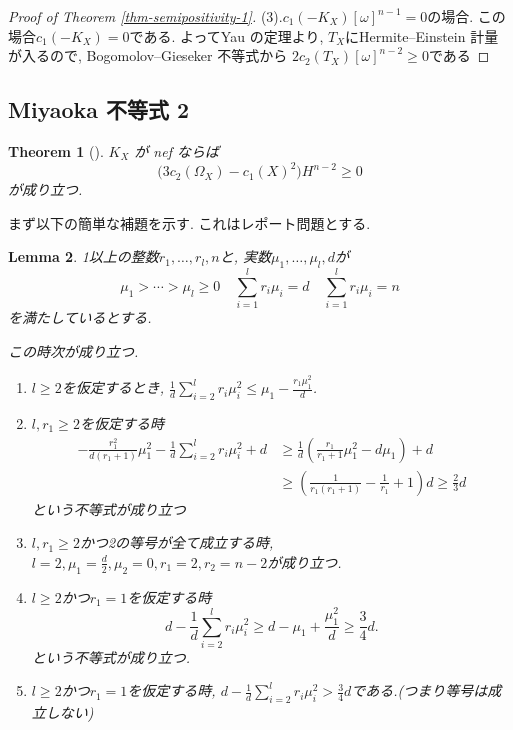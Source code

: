 \documentclass[dvipdfmx,a4paper,11pt]{article} %
\newtheorem{thm}{Theorem}[section]
\newtheorem{lem}[thm]{Lemma}
\theoremstyle{definition}
\theoremstyle{remark}
\numberwithin{equation}{section}
\begin{document}
\begin{proof}[Proof of Theorem \ref{thm-semipositivity-1}]
(3).$c_1(-K_X)[\omega]^{n-1}=0$の場合.
この場合$c_1(-K_X)=0$である. よってYau の定理より, $T_X$にHermite--Einstein 計量が入るので, Bogomolov--Gieseker 不等式から
$2c_2(T_X)[\omega]^{n-2} \ge 0$である
\end{proof}


\subsection{Miyaoka 不等式 2}

\begin{thm}[{\cite[Chapter 7]{Miy87}}]
\label{thm-semipositivity-2}
\(K_X\) が nef ならば
\[
\bigl(3c_2(\Omega_X)-c_1(X)^2\bigr)H^{n-2} \geq 0
\]
が成り立つ.
\end{thm}


まず以下の簡単な補題を示す. これはレポート問題とする.
\begin{lem}
\label{lem-miyaoka-2}
1以上の整数$r_1, \ldots, r_l, n$と, 実数$\mu_1, \ldots, \mu_l, d$が
\[
\mu_1 > \cdots > \mu_l \geq 0
\quad
\sum_{i=1}^{l}r_i\mu_i=d
\quad 
\sum_{i=1}^{l}r_i\mu_i=n
\]
を満たしているとする. 

この時次が成り立つ.
\begin{enumerate}
\item  $l\ge 2$を仮定するとき, $\frac{1}{d} \sum_{i=2}^{l}r_i \mu_i^2 \le \mu_1 - \frac{r_1 \mu_1^{2}}{d}$. 
\item $l, r_1\ge 2$を仮定する時
\begin{align*}
-\frac{r_1^2}{d(r_1+1)}\mu_1^2
-\frac{1}{d} \sum_{i=2}^{l}r_i \mu_i^2
+d
&\ge
\frac{1}{d}\left(
\frac{r_1}{r_1+1}\mu_1^2
-
d\mu_1
\right)
+d
\\
&\ge
\left(
\frac{1}{r_1(r_1+1)}-\frac{1}{r_1}+1
\right)d
\ge \frac{2}{3}d
\end{align*}
という不等式が成り立つ
\item $l, r_1\ge 2$かつ2の等号が全て成立する時, $l=2,\mu_1=\frac{d}{2}, \mu_2=0,r_1=2,r_2=n-2$が成り立つ.
\item $l\ge 2$かつ$r_1=1$を仮定する時
$$
d
-
\frac{1}{d} \sum_{i=2}^{l}r_i \mu_i^2 
\geq
d-\mu_1+\frac{\mu_1^2}{d} \geq
\frac{3}{4}d .
$$
という不等式が成り立つ.
\item $l\ge 2$かつ$r_1=1$を仮定する時, $d-\frac{1}{d} \sum_{i=2}^{l}r_i \mu_i^2 >\frac{3}{4}d $である.(つまり等号は成立しない) 
\end{enumerate}
\end{lem}
\end{document}
